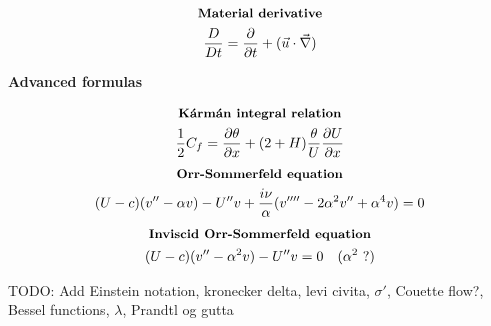 \documentclass[10pt, a4paper]{article}
\newcommand{\derivative}[2]{\frac{\partial #1}{\partial #2}}
\begin{document}
\begin{multicols*}{2}
    \begin{gather*}
        \textbf{\small Material derivative} \\
        \frac{D}{Dt} = \derivative{}{t} + (\vec{u}\cdot \vec{\nabla})
    \end{gather*}
\end{multicols*}
\begin{center}
    \Large
    \textbf{Advanced formulas}
    \vspace{0.5cm}
\end{center}
\begin{multicols*}{2}
    \begin{gather*}
        \textbf{\small Kármán integral relation} \\
        \frac12 C_f = \derivative{\theta}{x} + (2 + H) \frac{\theta}{U} \derivative{U}{x}
    \end{gather*}
    \begin{gather*}
        \textbf{\small Orr-Sommerfeld equation} \\
        (U - c)(v''-\alpha v) - U''v + \frac{i\nu}{\alpha}(v''''-2\alpha^2v''+\alpha^4v) = 0
    \end{gather*}
    \begin{gather*}
        \textbf{\small Inviscid Orr-Sommerfeld equation} \\
        (U - c)(v''-\alpha^2 v) - U''v = 0 \quad \text{($\alpha^2$ ?)}
    \end{gather*}
\end{multicols*}

TODO: Add Einstein notation, kronecker delta, levi civita, $\sigma '$, Couette flow?, Bessel functions, $\lambda$, Prandtl og gutta
\end{document}
